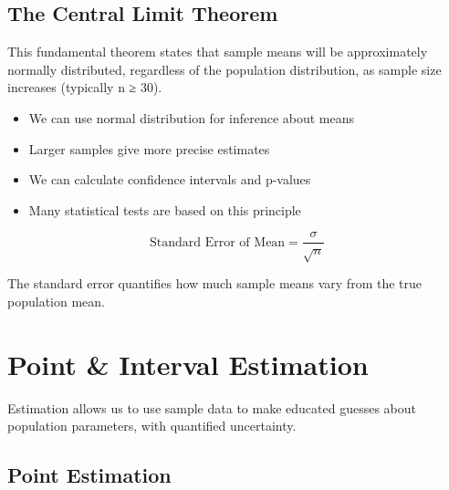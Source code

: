 \documentclass[
  11pt,
  letterpaper,
  oneside]{book}
\providecommand{\tightlist}{%
  \setlength{\itemsep}{0pt}\setlength{\parskip}{0pt}}\usepackage{longtable,booktabs,array}
\begin{document}
\subsection{The Central Limit Theorem}\label{the-central-limit-theorem}

This fundamental theorem states that sample means will be approximately
normally distributed, regardless of the population distribution, as
sample size increases (typically n ≥ 30).

\begin{tcolorbox}[enhanced jigsaw, toprule=.15mm, left=2mm, opacitybacktitle=0.6, colframe=quarto-callout-note-color-frame, leftrule=.75mm, titlerule=0mm, coltitle=black, colbacktitle=quarto-callout-note-color!10!white, toptitle=1mm, title=\textcolor{quarto-callout-note-color}{\faInfo}\hspace{0.5em}{Implications of Central Limit Theorem}, bottomtitle=1mm, arc=.35mm, rightrule=.15mm, bottomrule=.15mm, breakable, opacityback=0, colback=white]

\begin{itemize}
\tightlist
\item
  We can use normal distribution for inference about means
\item
  Larger samples give more precise estimates
\item
  We can calculate confidence intervals and p-values
\item
  Many statistical tests are based on this principle
\end{itemize}

\end{tcolorbox}

\[\text{Standard Error of Mean} = \frac{\sigma}{\sqrt{n}}\]

The standard error quantifies how much sample means vary from the true
population mean.

\section{Point \& Interval Estimation}\label{point-interval-estimation}

Estimation allows us to use sample data to make educated guesses about
population parameters, with quantified uncertainty.

\subsection{Point Estimation}\label{point-estimation}
\end{document}
